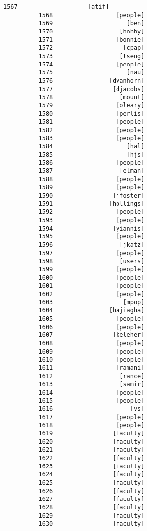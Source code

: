 \documentclass[11pt]{article}
\begin{document}
\begin{Verbatim}[commandchars=\\\{\}]
          1567                    [atif]
          1568                  [people]
          1569                     [ben]
          1570                   [bobby]
          1571                  [bonnie]
          1572                    [cpap]
          1573                   [tseng]
          1574                  [people]
          1575                     [nau]
          1576                [dvanhorn]
          1577                 [djacobs]
          1578                   [mount]
          1579                  [oleary]
          1580                  [perlis]
          1581                  [people]
          1582                  [people]
          1583                  [people]
          1584                     [hal]
          1585                     [hjs]
          1586                  [people]
          1587                   [elman]
          1588                  [people]
          1589                  [people]
          1590                 [jfoster]
          1591                [hollings]
          1592                  [people]
          1593                  [people]
          1594                 [yiannis]
          1595                  [people]
          1596                   [jkatz]
          1597                  [people]
          1598                   [users]
          1599                  [people]
          1600                  [people]
          1601                  [people]
          1602                  [people]
          1603                    [mpop]
          1604                [hajiagha]
          1605                  [people]
          1606                  [people]
          1607                 [keleher]
          1608                  [people]
          1609                  [people]
          1610                  [people]
          1611                  [ramani]
          1612                   [rance]
          1613                   [samir]
          1614                  [people]
          1615                  [people]
          1616                      [vs]
          1617                  [people]
          1618                  [people]
          1619                 [faculty]
          1620                 [faculty]
          1621                 [faculty]
          1622                 [faculty]
          1623                 [faculty]
          1624                 [faculty]
          1625                 [faculty]
          1626                 [faculty]
          1627                 [faculty]
          1628                 [faculty]
          1629                 [faculty]
          1630                 [faculty]

\end{Verbatim}
\end{document}
